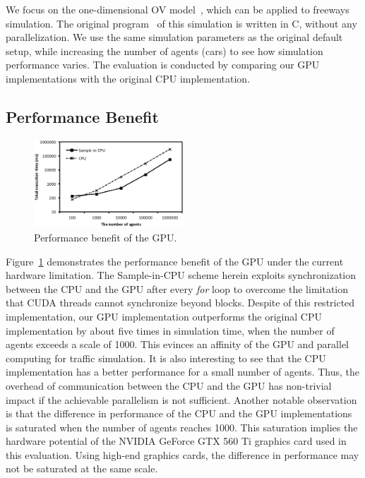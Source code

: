 \documentclass[times, 10pt, twocolumn]{article}
\begin{document}
We focus on the one-dimensional OV model~\cite{Bando1995}, which can be
applied to freeways simulation.
The original program~\cite{OV_Program} of this simulation is written in
C, without any parallelization.
We use the same simulation parameters as the original default setup,
while increasing the number of agents (cars) to see how simulation
performance varies. 
The evaluation is conducted by comparing our GPU implementations with
the original CPU implementation.

\subsection{Performance Benefit}

\begin{figure}[t]
\centering
\includegraphics[width=0.5\textwidth]{eps/eval_accel.eps}
\caption{Performance benefit of the GPU.}
\label{fig:eval_benefit}
\end{figure}

Figure~\ref{fig:eval_benefit} demonstrates the performance benefit of
the GPU under the current hardware limitation.
The Sample-in-CPU scheme herein exploits synchronization between the CPU
and the GPU after every \textit{for} loop to overcome the limitation that
CUDA threads cannot synchronize beyond blocks.
Despite of this restricted implementation, our GPU implementation
outperforms the original CPU implementation by about five times in
simulation time, when the number of agents exceeds a scale of 1000.
This evinces an affinity of the GPU and parallel computing for traffic
simulation.
It is also interesting to see that the CPU implementation has a better
performance for a small number of agents.
Thus, the overhead of communication between the CPU and the GPU has
non-trivial impact if the achievable parallelism is not sufficient.
Another notable observation is that the difference in performance of the
CPU and the GPU implementations is saturated when the number of agents
reaches 1000.
This saturation implies the hardware potential of the NVIDIA GeForce GTX
560 Ti graphics card used in this evaluation.
Using high-end graphics cards, the difference in performance may not be
saturated at the same scale.
\end{document}

